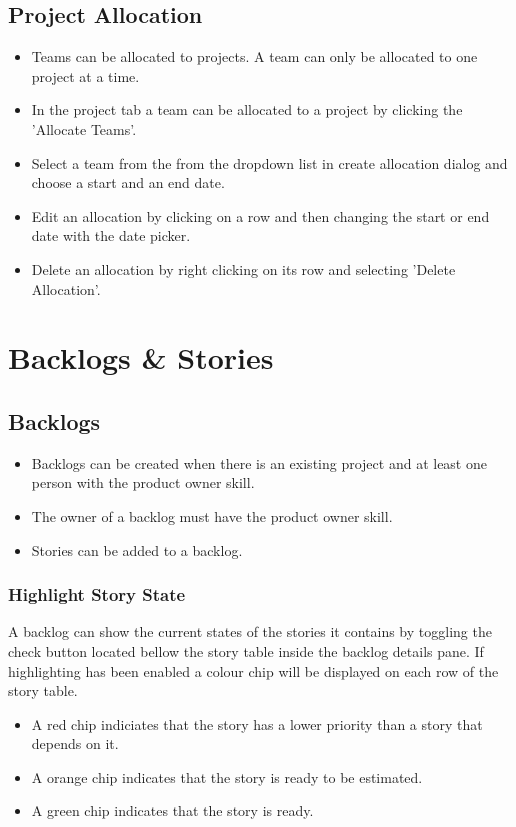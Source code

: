 \documentclass[11pt,fleqn]{book} %
\begin{document}
\subsection{Project Allocation}
\begin{itemize}
  \item Teams can be allocated to projects. A team can only be allocated to one project at a time.
  \item In the project tab a team can be allocated to a project by clicking the 'Allocate Teams'.
  \item Select a team from the from the dropdown list in create allocation dialog and choose a start and an end date.
  \item Edit an allocation by clicking on a row and then changing the start or end date with the date picker.
  \item Delete an allocation by right clicking on its row and selecting 'Delete Allocation'.
\end{itemize}
\section{Backlogs \& Stories}

\subsection{Backlogs}

\begin{itemize}
\item Backlogs can be created when there is an existing project and at least one person with the product owner skill.
\item The owner of a backlog must have the product owner skill. 
\item Stories can be added to a backlog.
\end{itemize}

\subsubsection{Highlight Story State}
A backlog can show the current states of the stories it contains by toggling the check button located bellow the story table inside the backlog details pane.
If highlighting has been enabled a colour chip will be displayed on each row of the story table.
\begin{itemize}
\item A red chip indiciates that the story has a lower priority than a story that depends on it.
\item A orange chip indicates that the story is ready to be estimated.
\item A green chip indicates that the story is ready.
\end{itemize}
\end{document}
